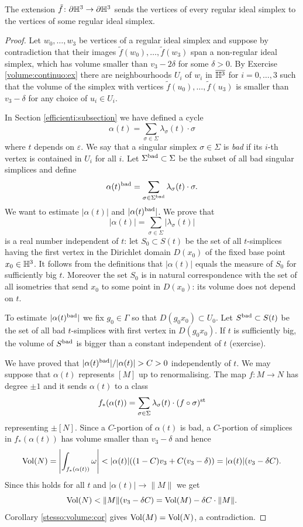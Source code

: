 \begin{lemma} \label{regolare:lemma}
The extension $\tilde f\colon \partial\mathbb{H}^3 \to \partial \mathbb{H}^3$ sends the vertices of every regular ideal simplex to the vertices of some regular ideal simplex. 
\end{lemma}
\begin{proof}
Let $w_0,\ldots, w_3$ be vertices of a regular ideal simplex and suppose by contradiction that their images $\tilde f(w_0),\ldots ,\tilde f(w_3)$ span a non-regular ideal simplex, which has volume smaller than $v_3-2\delta$ for some $\delta >0$. 
By Exercise \ref{volume:continuo:ex} there are neighbourhoods $U_i$ of $w_i$ in $\overline{\mathbb{H}^3}$ for $i=0,\ldots, 3$ such that the volume of the simplex with vertices $\tilde f(u_0), \ldots, \tilde f(u_3)$ is smaller than $v_3-\delta$ for any choice of $u_i\in U_i$. 

In Section \ref{efficienti:subsection} we have defined a cycle
$$\alpha(t) = \sum_{\sigma \in \Sigma} \lambda_\sigma(t) \cdot \sigma$$
where $t$ depends on $\varepsilon$. We say that a singular simplex $\sigma\in \Sigma$ is \emph{bad} if its $i$-th vertex is contained in $U_i$ for all $i$. 
Let $\Sigma^{\rm bad}\subset\Sigma$ be the subset of all bad singular simplices and define
$$\alpha(t)^{\rm bad} = \sum_{\sigma \in \Sigma^{\rm bad}} \lambda_\sigma(t) \cdot \sigma.$$
We want to estimate $|\alpha(t)|$ and $|\alpha(t)^{\rm bad}|$. We prove that  
$$|\alpha(t)| = \sum_{\sigma\in \Sigma} |\lambda_\sigma(t)|$$
is a real number independent of $t$: let $S_0\subset S(t)$ be the set of all $t$-simplices having the first vertex in the Dirichlet domain $D(x_0)$ of the fixed base point $x_0\in\mathbb{H}^3$. It follows from the definitions that $|\alpha(t)|$ equals the measure of $S_0$ for sufficiently big $t$. Moreover the set $S_0$ is in natural correspondence with the set of all isometries that send $x_0$ to some point in $D(x_0)$: its volume does not depend on $t$. 

To estimate $|\alpha(t)^{\rm bad}|$ we fix $g_0\in \Gamma$ so that $D(g_0x_0)\subset U_0$. Let $S^{\rm bad}\subset S(t)$ be the set of all bad $t$-simplices with first vertex in $D(g_0x_0)$. If $t$ is sufficiently big, the volume of $S^{\rm bad}$ is bigger than a constant independent of $t$ (exercise). 

We have proved that $|\alpha(t)^{\rm bad}| / |\alpha(t)|>C>0$ independently of $t$. We may suppose that $\alpha(t)$ represents $[M]$ up to renormalising. The map $f\colon M \to N$ has degree $\pm 1$ and it sends $\alpha(t)$ to a class 
$$f_*(\alpha(t)) = \sum_{\sigma\in \Sigma} \lambda_\sigma(t) \cdot (f\circ\sigma)^{\rm st} $$
representing $\pm [N]$. Since a $C$-portion of $\alpha(t)$ is bad, a $C$-portion of simplices in $f_*(\alpha(t))$ has volume smaller than $v_3-\delta$ and hence
$${\rm Vol}(N) = \left|\int_{f_*(\alpha(t))} \omega\right| < |\alpha(t)| ( (1-C)v_3 + C(v_3 - \delta)) = |\alpha(t)| (v_3 -\delta C).$$
Since this holds for all $t$ and $|\alpha(t)| \to \|M\|$ we get
$${\rm Vol}(N) < \|M\| (v_3 - \delta C) = {\rm Vol} (M) - \delta C \cdot \|M\|.$$
Corollary \ref{stesso:volume:cor} gives ${\rm Vol}(M) = {\rm Vol}(N)$, a contradiction.
\end{proof}


